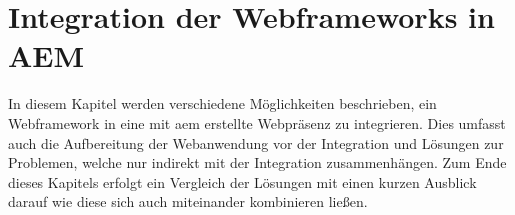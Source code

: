 \chapter{Integration der Webframeworks in AEM}
\label{sec:integration-der-webframeworks-in-aem}
In diesem Kapitel werden verschiedene Möglichkeiten beschrieben, ein Webframework in eine mit \ac{aem} erstellte Webpräsenz zu integrieren. Dies umfasst auch die Aufbereitung der Webanwendung vor der Integration und Lösungen zur Problemen, welche nur indirekt mit der Integration zusammenhängen. Zum Ende dieses Kapitels erfolgt ein Vergleich der Lösungen mit einen kurzen Ausblick darauf wie diese sich auch miteinander kombinieren ließen.


















